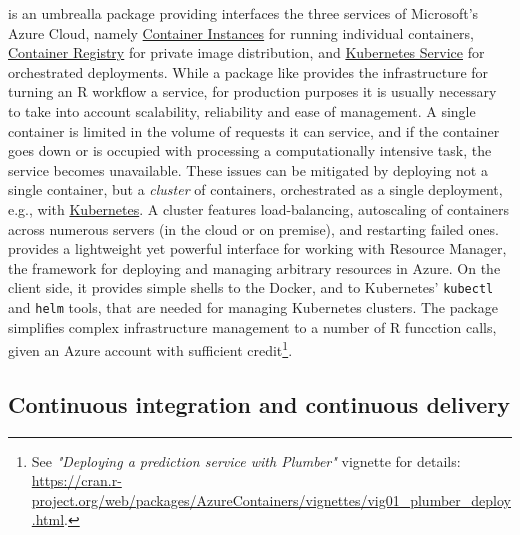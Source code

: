 \label{azurecontainers} \textbf{} is an umbrealla
package providing interfaces the three services of Microsoft's Azure
Cloud, namely
\href{https://azure.microsoft.com/en-us/services/container-instances/}{Container
Instances} for running individual containers,
\href{https://azure.microsoft.com/en-us/services/container-registry/}{Container
Registry} for private image distribution, and
\href{https://azure.microsoft.com/en-us/services/kubernetes-service/}{Kubernetes
Service} for orchestrated deployments. While a package like
 provides the infrastructure for turning an R workflow a
service, for production purposes it is usually necessary to take into
account scalability, reliability and ease of management. A single
container is limited in the volume of requests it can service, and if
the container goes down or is occupied with processing a computationally
intensive task, the service becomes unavailable. These issues can be
mitigated by deploying not a single container, but a \emph{cluster} of
containers, orchestrated as a single deployment, e.g., with
\href{https://kubernetes.io}{Kubernetes}. A cluster features
load-balancing, autoscaling of containers across numerous servers (in
the cloud or on premise), and restarting failed ones.
 provides a lightweight yet powerful interface for
working with Resource Manager, the framework for deploying and managing
arbitrary resources in Azure. On the client side, it provides simple
shells to the Docker, and to Kubernetes' \texttt{kubectl} and
\texttt{helm} tools, that are needed for managing Kubernetes clusters.
The package simplifies complex infrastructure management to a number of
R funcction calls, given an Azure account with sufficient
credit\footnote{See \emph{"Deploying a prediction service with Plumber"} vignette for details:  \href{https://cran.r-project.org/web/packages/AzureContainers/vignettes/vig01_plumber_deploy.html}{https://cran.r-project.org/web/packages/AzureContainers/vignettes/vig01\_plumber\_deploy.html}.}.

\hypertarget{continuous-integration-and-continuous-delivery-colinfaynoamross-colinfay}{%
\subsection{\texorpdfstring{Continuous integration and continuous
delivery
\citep[\citet{ColinFay}]{noamross}}{Continuous integration and continuous delivery , @ColinFay{[}@noamross, @ColinFay{]}}}\label{continuous-integration-and-continuous-delivery-colinfaynoamross-colinfay}}

